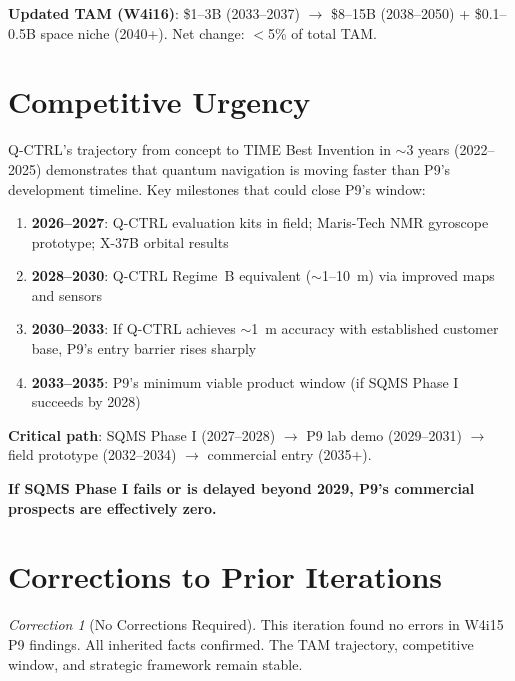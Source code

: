 \documentclass[11pt]{article}
\theoremstyle{definition}
\theoremstyle{remark}
\newtheorem{correction}[theorem]{Correction}
\begin{document}
\textbf{Updated TAM (W4i16)}: \$1--3B (2033--2037) $\to$
\$8--15B (2038--2050) + \$0.1--0.5B space niche (2040+).
Net change: $<$5\% of total TAM.

\section{Competitive Urgency}
\label{sec:urgency}

\begin{tcolorbox}[colback=red!5!white, colframe=red!75!black,
  title=\textbf{Competitive Urgency Assessment}]
Q-CTRL's trajectory from concept to TIME Best Invention in $\sim$3 years
(2022--2025) demonstrates that quantum navigation is moving faster than
P9's development timeline. Key milestones that could close P9's window:

\begin{enumerate}[nosep]
  \item \textbf{2026--2027}: Q-CTRL evaluation kits in field;
    Maris-Tech NMR gyroscope prototype; X-37B orbital results
  \item \textbf{2028--2030}: Q-CTRL Regime~B equivalent
    ($\sim$1--10~m) via improved maps and sensors
  \item \textbf{2030--2033}: If Q-CTRL achieves $\sim$1~m accuracy
    with established customer base, P9's entry barrier rises sharply
  \item \textbf{2033--2035}: P9's minimum viable product window
    (if SQMS Phase I succeeds by 2028)
\end{enumerate}

\textbf{Critical path}: SQMS Phase I (2027--2028) $\to$
P9 lab demo (2029--2031) $\to$ field prototype (2032--2034)
$\to$ commercial entry (2035+).

\textbf{If SQMS Phase I fails or is delayed beyond 2029,
P9's commercial prospects are effectively zero.}
\end{tcolorbox}

\section{Corrections to Prior Iterations}
\label{sec:corrections}

\begin{correction}[No Corrections Required]
This iteration found no errors in W4i15 P9 findings.
All inherited facts confirmed. The TAM trajectory, competitive
window, and strategic framework remain stable.
\end{correction}
\end{document}
